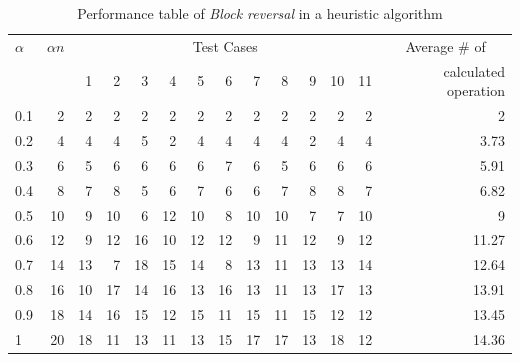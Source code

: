 \begin{table}[!tb]
  \begin{center}
    \caption{Performance table of \emph{Block reversal} in a heuristic algorithm}
    \label{tab_our}

    \begin{tabular}{|l|r|r|r|r|r|r|r|r|r|r|r|r|r|}
      \hline
      $\alpha$     & $\alpha n$ & \multicolumn{11}{c|}{Test Cases} & \multicolumn{1}{c|}{Average \# of}                                     \\
      \cline{3-13} &            & 1                                & 2  & 3  & 4  & 5  & 6  & 7  & 8  & 9  & 10 & 11 & calculated operation \\
      \hline
      0.1        & 2          & 2                                & 2	& 2  & 2  & 2  & 2  & 2  & 2  &	2  & 2	& 2  & 2                    \\
      0.2        & 4          & 4                                & 4	& 5  & 2  & 4  & 4  & 4  & 4  &	2  & 4	& 4  & 3.73                 \\
      0.3        & 6          & 5                                & 6	& 6  & 6  & 6  & 7  & 6  & 5  &	6  & 6	& 6  & 5.91                 \\
      0.4        & 8          & 7                                & 8	& 5  & 6  & 7  & 6  & 6  & 7  &	8  & 8	& 7  & 6.82                 \\
      0.5        & 10         & 9                                & 10	& 6  & 12 & 10 & 8  & 10 & 10 &	7  & 7	& 10 & 9                    \\
      0.6        & 12         & 9                                & 12	& 16 & 10 & 12 & 12 & 9  & 11 &	12 & 9	& 12 & 11.27                \\
      0.7        & 14         & 13                               & 7	& 18 & 15 & 14 & 8  & 13 & 11 &	13 & 13	& 14 & 12.64                \\
      0.8        & 16         & 10                               & 17	& 14 & 16 & 13 & 16 & 13 & 11 &	13 & 17	& 13 & 13.91                \\
      0.9        & 18         & 14                               & 16	& 15 & 12 & 15 & 11 & 15 & 11 &	15 & 12	& 12 & 13.45                \\
      1          & 20         & 18                               & 11	& 13 & 11 & 13 & 15 & 17 & 17 &	13 & 18	& 12 & 14.36                \\
      \hline
    \end{tabular}
  \end{center}
\end{table}


